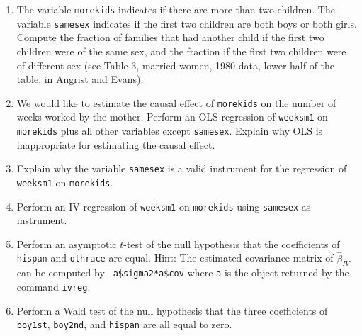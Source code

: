 \documentclass{article}
\begin{document}
\begin{enumerate}
\item The variable \texttt{morekids} indicates if there are more than two
children. The variable \texttt{samesex} indicates if the first two children
are both boys or both girls. Compute the fraction of families that had
another child if the first two children were of the same sex, and the
fraction if the first two children were of different sex (see Table 3,
married women, 1980 data, lower half of the table, in Angrist and Evans).

\item We would like to estimate the causal effect of \texttt{morekids} on
the number of weeks worked by the mother. Perform an OLS regression of
\texttt{weeksm1} on \texttt{morekids} plus all other variables except
\texttt{samesex}. Explain why OLS is inappropriate for estimating the causal
effect.

\item Explain why the variable \texttt{samesex} is a valid instrument for
the regression of \texttt{weeksm1} on \texttt{morekids}.

\item Perform an IV regression of \texttt{weeksm1} on \texttt{morekids}
using \texttt{samesex} as instrument.

\item Perform an asymptotic $t$-test of the null hypothesis that the
coefficients of \texttt{hispan} and \texttt{othrace} are equal. Hint: The
estimated covariance matrix of $\hat{\beta}_{IV}$ can be computed by \texttt{%
a\$sigma2*a\$cov} where \texttt{a} is the object returned by the
command \texttt{ivreg}.

\item Perform a Wald test of the null hypothesis that the three coefficients
of \texttt{boy1st}, \texttt{boy2nd}, and \texttt{hispan} are all equal to
zero.
\end{enumerate}
\end{document}
